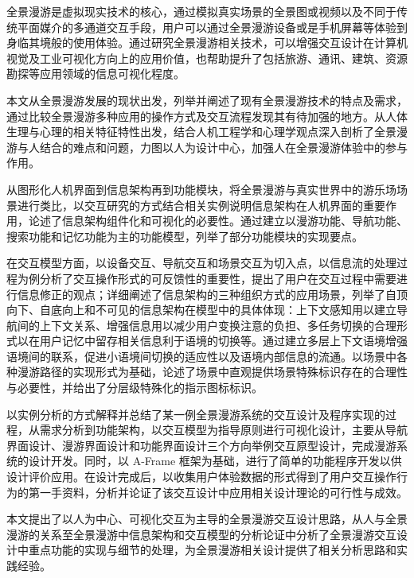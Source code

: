 \begin{cnabstract}
\begin{spacing}{1.0}
全景漫游是虚拟现实技术的核心，通过模拟真实场景的全景图或视频以及不同于传统平面媒介的多通道交互手段，用户可以通过全景漫游设备或是手机屏幕等体验到身临其境般的使用体验。通过研究全景漫游相关技术，可以增强交互设计在计算机视觉及工业可视化方向上的应用价值，也帮助提升了包括旅游、通讯、建筑、资源勘探等应用领域的信息可视化程度。

本文从全景漫游发展的现状出发，列举并阐述了现有全景漫游技术的特点及需求，通过比较全景漫游多种应用的操作方式及交互流程发现其有待加强的地方。从人体生理与心理的相关特征特性出发，结合人机工程学和心理学观点深入剖析了全景漫游与人结合的难点和问题，力图以人为设计中心，加强人在全景漫游体验中的参与作用。

从图形化人机界面到信息架构再到功能模块，将全景漫游与真实世界中的游乐场场景进行类比，以交互研究的方式结合相关实例说明信息架构在人机界面的重要作用，论述了信息架构组件化和可视化的必要性。通过建立以漫游功能、导航功能、搜索功能和记忆功能为主的功能模型，列举了部分功能模块的实现要点。

在交互模型方面，以设备交互、导航交互和场景交互为切入点，以信息流的处理过程为例分析了交互操作形式的可反馈性的重要性，提出了用户在交互过程中需要进行信息修正的观点；详细阐述了信息架构的三种组织方式的应用场景，列举了自顶向下、自底向上和不可见的信息架构在模型中的具体体现：上下文感知用以建立导航间的上下文关系、增强信息用以减少用户变换注意的负担、多任务切换的合理形式以在用户记忆中留存相关信息利于语境的切换等。通过建立多层上下文语境增强语境间的联系，促进小语境间切换的适应性以及语境内部信息的流通。以场景中各种漫游路径的实现形式为基础，论述了场景中直观提供场景特殊标识存在的合理性与必要性，并给出了分层级特殊化的指示图标标识。

以实例分析的方式解释并总结了某一例全景漫游系统的交互设计及程序实现的过程，从需求分析到功能架构，以交互模型为指导原则进行可视化设计，主要从导航界面设计、漫游界面设计和功能界面设计三个方向举例交互原型设计，完成漫游系统的设计开发。同时，以 A-Frame 框架为基础，进行了简单的功能程序开发以供设计评价应用。在设计完成后，以收集用户体验数据的形式得到了用户交互操作行为的第一手资料，分析并论证了该交互设计中应用相关设计理论的可行性与成效。

本文提出了以人为中心、可视化交互为主导的全景漫游交互设计思路，从人与全景漫游的关系至全景漫游中信息架构和交互模型的分析论证中分析了全景漫游交互设计中重点功能的实现与细节的处理，为全景漫游相关设计提供了相关分析思路和实践经验。

\end{spacing}
\end{cnabstract}


